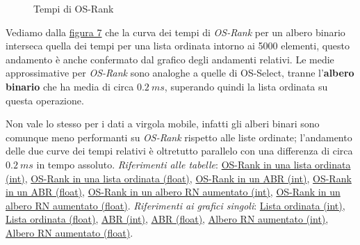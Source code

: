 \documentclass[onecolumn]{article}
\begin{document}
\begin{figure}[H]
	\caption{Tempi di OS-Rank}
	\label{fig:os-rank-m}
\end{figure}

Vediamo dalla \hyperref[fig:os-rank-m]{figura 7} che la curva dei tempi di \textit{OS-Rank} per un albero binario interseca quella dei tempi per una lista ordinata intorno ai 5000 elementi, questo andamento è anche confermato dal grafico degli andamenti relativi. Le medie approssimative per \textit{OS-Rank} sono analoghe a quelle di OS-Select, tranne l'\textbf{albero binario} che ha media di circa \(0.2\:ms\), superando quindi la lista ordinata su questa operazione.

Non vale lo stesso per i dati a virgola mobile, infatti gli alberi binari sono comunque meno performanti su \textit{OS-Rank} rispetto alle liste ordinate; l'andamento delle due curve dei tempi relativi è oltretutto parallelo con una differenza di circa \(0.2\:ms\) in tempo assoluto.
\newline
\textit{Riferimenti alle tabelle}: \hyperref[label:lista-ordinata-m-os-rank]{OS-Rank in una lista ordinata (int)}, \hyperref[label:lista-ordinata-m-float-os-rank]{OS-Rank in una lista ordinata (float)}, \hyperref[label:abr-m-os-rank]{OS-Rank in un ABR (int)}, \hyperref[label:abr-m-float-os-rank]{OS-Rank in un ABR (float)}, \hyperref[label:rn-aumentato-m-os-rank]{OS-Rank in un albero RN aumentato (int)}, \hyperref[label:rn-aumentato-m-float-os-rank]{OS-Rank in un albero RN aumentato (float)}.
\newline
\newline
\textit{Riferimenti ai grafici singoli}: \hyperref[label:lista-ordinata-m]{Lista ordinata (int)}, \hyperref[label:lista-ordinata-m-float]{Lista ordinata (float)}, \hyperref[label:abr-m]{ABR (int)}, \hyperref[label:abr-m-float]{ABR (float)}, \hyperref[label:rn-aumentato-m]{Albero RN aumentato (int)}, \hyperref[label:rn-aumentato-m-float]{Albero RN aumentato (float)}.
\end{document}
